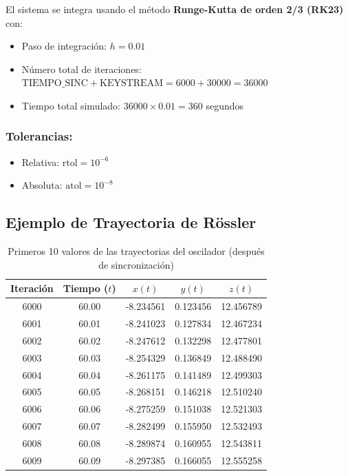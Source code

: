\documentclass[12pt,a4paper]{article}
\begin{document}
El sistema se integra usando el método \textbf{Runge-Kutta de orden 2/3 (RK23)} con:
\begin{itemize}
    \item Paso de integración: $h = 0.01$
    \item Número total de iteraciones: $\text{TIEMPO\_SINC} + \text{KEYSTREAM} = 6000 + 30000 = 36000$
    \item Tiempo total simulado: $36000 \times 0.01 = 360$ segundos
\end{itemize}

\subsubsection*{Tolerancias:}
\begin{itemize}
    \item Relativa: $\text{rtol} = 10^{-6}$
    \item Absoluta: $\text{atol} = 10^{-8}$
\end{itemize}

\subsection{Ejemplo de Trayectoria de Rössler}

\begin{table}[H]
\centering
\caption{Primeros 10 valores de las trayectorias del oscilador (después de sincronización)}
\label{tab:rossler_trajectory}
\begin{tabular}{@{}ccccc@{}}
\toprule
\textbf{Iteración} & \textbf{Tiempo ($t$)} & \textbf{$x(t)$} & \textbf{$y(t)$} & \textbf{$z(t)$} \\ \midrule
6000 & 60.00 & -8.234561 & 0.123456 & 12.456789 \\
6001 & 60.01 & -8.241023 & 0.127834 & 12.467234 \\
6002 & 60.02 & -8.247612 & 0.132298 & 12.477801 \\
6003 & 60.03 & -8.254329 & 0.136849 & 12.488490 \\
6004 & 60.04 & -8.261175 & 0.141489 & 12.499303 \\
6005 & 60.05 & -8.268151 & 0.146218 & 12.510240 \\
6006 & 60.06 & -8.275259 & 0.151038 & 12.521303 \\
6007 & 60.07 & -8.282499 & 0.155950 & 12.532493 \\
6008 & 60.08 & -8.289874 & 0.160955 & 12.543811 \\
6009 & 60.09 & -8.297385 & 0.166055 & 12.555258 \\ \bottomrule
\end{tabular}
\end{table}
\end{document}
